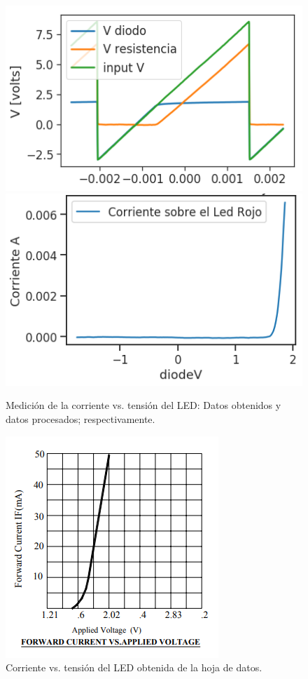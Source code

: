 \begin{figure}[H]
\centering
\includegraphics[scale=0.5]{../EJ1/LED/datosOsciloscopioLED}
\includegraphics[scale=0.5]{../EJ1/LED/LEDMedido}
\caption{Medici\'on de la corriente vs. tensi\'on del LED: Datos obtenidos y datos procesados; respectivamente.}
\label{med3b}
\end{figure}

\begin{figure}[!ht]
\centering
\includegraphics[scale=0.52]{../EJ1/LED/LedDataSheet}
\caption{Corriente vs. tensi\'on del LED obtenida de la hoja de datos.}
\label{med3c}
\end{figure}
